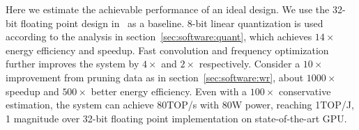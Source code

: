 Here we estimate the achievable performance of an ideal design. We use the 32-bit floating point design in~\cite{zhang2017improving} as a baseline. 8-bit linear quantization is used according to the analysis in section~\ref{sec:software:quant}, which achieves $14\times$ energy efficiency and speedup. Fast convolution and frequency optimization further improves the system by $4\times$ and $2\times$ respectively. Consider a $10\times$ improvement from pruning data as in section~\ref{sec:software:wr}, about $1000\times$ speedup and $500\times$ better energy efficiency. Even with a $100\times$ conservative estimation, the system can achieve  80TOP/s with 80W power, reaching 1TOP/J, 1 magnitude over 32-bit floating point implementation on state-of-the-art GPU. 

